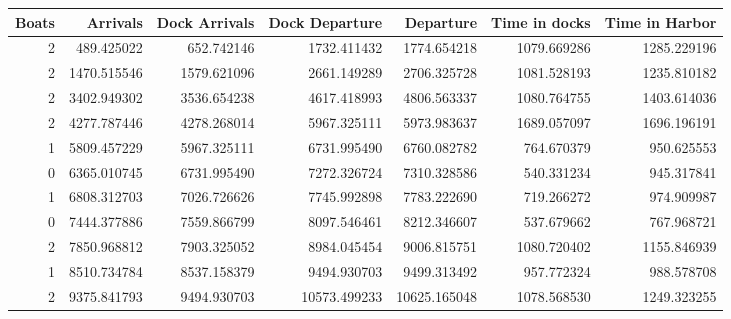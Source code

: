 \begin{tabular}{rrrrrrr}
\toprule
 Boats &     Arrivals &  Dock Arrivals &  Dock Departure &     Departure &  Time in docks &  Time in Harbor \\
\midrule
     2 &   489.425022 &     652.742146 &     1732.411432 &   1774.654218 &    1079.669286 &     1285.229196 \\
     2 &  1470.515546 &    1579.621096 &     2661.149289 &   2706.325728 &    1081.528193 &     1235.810182 \\
     2 &  3402.949302 &    3536.654238 &     4617.418993 &   4806.563337 &    1080.764755 &     1403.614036 \\
     2 &  4277.787446 &    4278.268014 &     5967.325111 &   5973.983637 &    1689.057097 &     1696.196191 \\
     1 &  5809.457229 &    5967.325111 &     6731.995490 &   6760.082782 &     764.670379 &      950.625553 \\
     0 &  6365.010745 &    6731.995490 &     7272.326724 &   7310.328586 &     540.331234 &      945.317841 \\
     1 &  6808.312703 &    7026.726626 &     7745.992898 &   7783.222690 &     719.266272 &      974.909987 \\
     0 &  7444.377886 &    7559.866799 &     8097.546461 &   8212.346607 &     537.679662 &      767.968721 \\
     2 &  7850.968812 &    7903.325052 &     8984.045454 &   9006.815751 &    1080.720402 &     1155.846939 \\
     1 &  8510.734784 &    8537.158379 &     9494.930703 &   9499.313492 &     957.772324 &      988.578708 \\
     2 &  9375.841793 &    9494.930703 &    10573.499233 &  10625.165048 &    1078.568530 &     1249.323255 \\
\bottomrule
\end{tabular}
